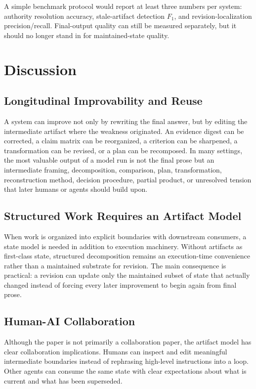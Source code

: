 \documentclass{article}
\begin{document}
A simple benchmark protocol would report at least three numbers per system: authority resolution accuracy, stale-artifact detection $F_1$, and revision-localization precision/recall. Final-output quality can still be measured separately, but it should no longer stand in for maintained-state quality.

\section{Discussion}

\subsection{Longitudinal Improvability and Reuse}

A system can improve not only by rewriting the final answer, but by editing the intermediate artifact where the weakness originated. An evidence digest can be corrected, a claim matrix can be reorganized, a criterion can be sharpened, a transformation can be revised, or a plan can be recomposed. In many settings, the most valuable output of a model run is not the final prose but an intermediate framing, decomposition, comparison, plan, transformation, reconstruction method, decision procedure, partial product, or unresolved tension that later humans or agents should build upon.

\subsection{Structured Work Requires an Artifact Model}

When work is organized into explicit boundaries with downstream consumers, a state model is needed in addition to execution machinery. Without artifacts as first-class state, structured decomposition remains an execution-time convenience rather than a maintained substrate for revision. The main consequence is practical: a revision can update only the maintained subset of state that actually changed instead of forcing every later improvement to begin again from final prose.

\subsection{Human-AI Collaboration}

Although the paper is not primarily a collaboration paper, the artifact model has clear collaboration implications. Humans can inspect and edit meaningful intermediate boundaries instead of rephrasing high-level instructions into a loop. Other agents can consume the same state with clear expectations about what is current and what has been superseded.
\end{document}
